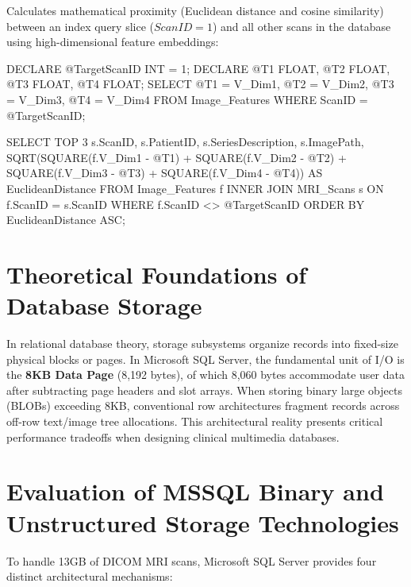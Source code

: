 Calculates mathematical proximity (Euclidean distance and cosine similarity) between an index query slice ($ScanID = 1$) and all other scans in the database using high-dimensional feature embeddings:
\begin{SQLCode}
DECLARE @TargetScanID INT = 1;
DECLARE @T1 FLOAT, @T2 FLOAT, @T3 FLOAT, @T4 FLOAT;
SELECT @T1 = V_Dim1, @T2 = V_Dim2, @T3 = V_Dim3, @T4 = V_Dim4 
FROM Image_Features WHERE ScanID = @TargetScanID;

SELECT TOP 3 s.ScanID, s.PatientID, s.SeriesDescription, s.ImagePath,
    SQRT(SQUARE(f.V_Dim1 - @T1) + SQUARE(f.V_Dim2 - @T2) + 
         SQUARE(f.V_Dim3 - @T3) + SQUARE(f.V_Dim4 - @T4)) AS EuclideanDistance
FROM Image_Features f
INNER JOIN MRI_Scans s ON f.ScanID = s.ScanID
WHERE f.ScanID <> @TargetScanID
ORDER BY EuclideanDistance ASC;
\end{SQLCode}

\section{Theoretical Foundations of Database Storage}
In relational database theory, storage subsystems organize records into fixed-size physical blocks or pages. In Microsoft SQL Server, the fundamental unit of I/O is the \textbf{8KB Data Page} (8,192 bytes), of which 8,060 bytes accommodate user data after subtracting page headers and slot arrays. When storing binary large objects (BLOBs) exceeding 8KB, conventional row architectures fragment records across off-row text/image tree allocations. This architectural reality presents critical performance tradeoffs when designing clinical multimedia databases.

\section{Evaluation of MSSQL Binary and Unstructured Storage Technologies}
To handle 13GB of DICOM MRI scans, Microsoft SQL Server provides four distinct architectural mechanisms:


